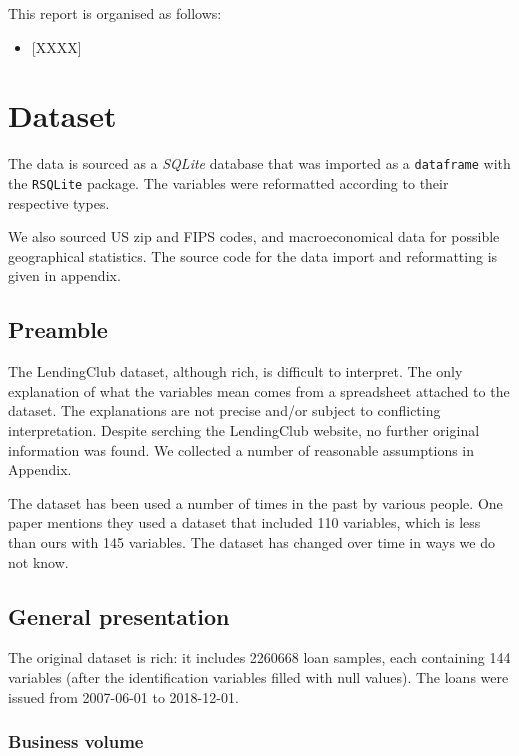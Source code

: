 \documentclass[11pt,]{report}
\providecommand{\tightlist}{%
  \setlength{\itemsep}{0pt}\setlength{\parskip}{0pt}}
\begin{document}
This report is organised as follows:

\begin{itemize}
\tightlist
\item
  {[}XXXX{]}
\end{itemize}

\hypertarget{dataset}{%
\chapter{Dataset}\label{dataset}}

The data is sourced as a \emph{SQLite} database that was imported as a \texttt{dataframe} with the \texttt{RSQLite} package. The variables were reformatted according to their respective types.

We also sourced US zip and FIPS codes, and macroeconomical data for possible geographical statistics. The source code for the data import and reformatting is given in appendix.

\hypertarget{preamble}{%
\section{Preamble}\label{preamble}}

The LendingClub dataset, although rich, is difficult to interpret. The only explanation of what the variables mean comes from a spreadsheet attached to the dataset. The explanations are not precise and/or subject to conflicting interpretation. Despite serching the LendingClub website, no further original information was found. We collected a number of reasonable assumptions in Appendix.

The dataset has been used a number of times in the past by various people. One paper \citep{kim2019ensemble} mentions they used a dataset that included 110 variables, which is less than ours with 145 variables. The dataset has changed over time in ways we do not know.

\hypertarget{general-presentation}{%
\section{General presentation}\label{general-presentation}}

The original dataset is rich: it includes 2260668 loan samples, each containing 144 variables (after the identification variables filled with null values). The loans were issued from 2007-06-01 to 2018-12-01.

\hypertarget{business-volume}{%
\subsection{Business volume}\label{business-volume}}
\end{document}
